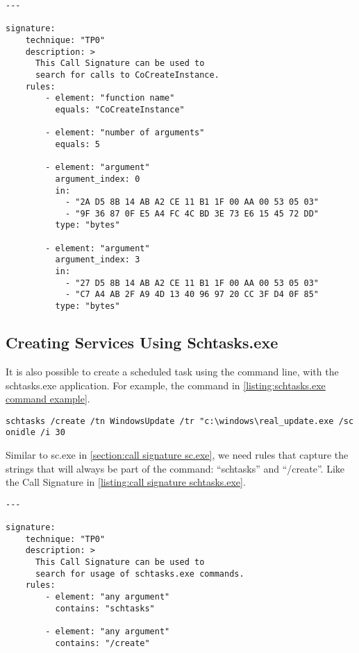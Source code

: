 \begin{lstlisting}[label={listing:call signature CoCreateInstance}, caption={A Call Signature that matches a call to \texttt{CoCreateInstance}.}, captionpos=b]
---

signature:
    technique: "TP0"
    description: >
      This Call Signature can be used to
      search for calls to CoCreateInstance.
    rules:
        - element: "function name"
          equals: "CoCreateInstance"

        - element: "number of arguments"
          equals: 5

        - element: "argument"
          argument_index: 0
          in:
            - "2A D5 8B 14 AB A2 CE 11 B1 1F 00 AA 00 53 05 03"
            - "9F 36 87 0F E5 A4 FC 4C BD 3E 73 E6 15 45 72 DD"
          type: "bytes"

        - element: "argument"
          argument_index: 3
          in:
            - "27 D5 8B 14 AB A2 CE 11 B1 1F 00 AA 00 53 05 03"
            - "C7 A4 AB 2F A9 4D 13 40 96 97 20 CC 3F D4 0F 85"
          type: "bytes"
\end{lstlisting}

\subsection{Creating Services Using Schtasks.exe}
It is also possible to create a scheduled task using the command line, with the schtasks.exe application. For example, the command in \autoref{listing:schtasks.exe command example}.

\begin{lstlisting}[label={listing:schtasks.exe command example}, caption={An example \texttt{schtasks.exe} command that runs a fictitious executable when a user is idle for 30 minutes.}, captionpos=b]
schtasks /create /tn WindowsUpdate /tr "c:\windows\real_update.exe /sc onidle /i 30
\end{lstlisting}

Similar to sc.exe in \autoref{section:call signature sc.exe}, we need rules that capture the strings that will always be part of the command: ``schtasks'' and ``/create''. Like the Call Signature in \autoref{listing:call signature schtasks.exe}.

\begin{lstlisting}[label={listing:call signature schtasks.exe}, caption={A Call Signature that matches creating a scheduled task using the \texttt{schtasks.exe} application.}, captionpos=b]
---

signature:
    technique: "TP0"
    description: >
      This Call Signature can be used to
      search for usage of schtasks.exe commands.
    rules:
        - element: "any argument"
          contains: "schtasks"

        - element: "any argument"
          contains: "/create"
\end{lstlisting}

